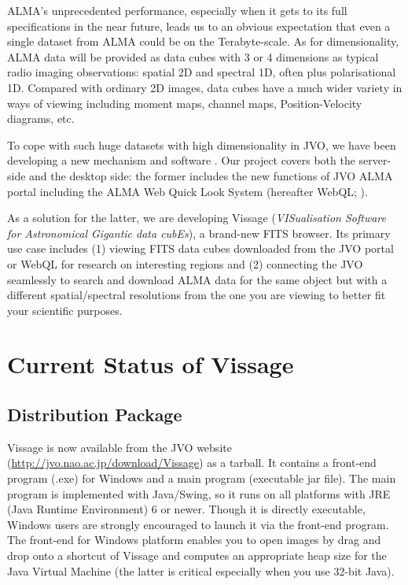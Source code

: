 ALMA's unprecedented performance, especially when it gets to its full specifications in the near future, leads us to an obvious expectation that even a single dataset from ALMA could be on the Terabyte-scale. As for dimensionality, ALMA data will be provided as data cubes with 3 or 4 dimensions as typical radio imaging observations: spatial 2D and spectral  1D, often plus polarisational 1D. Compared with ordinary 2D images, data cubes have a much wider variety in ways of viewing including moment maps, channel maps, Position-Velocity diagrams, etc. 

To cope with such huge datasets with high dimensionality in JVO, we have been developing a new mechanism and software \citep{O10_adassxxii, D5_adassxxii}. Our project covers both the server-side and the desktop side: the former includes the new functions of JVO ALMA portal including the ALMA Web Quick Look System (hereafter WebQL; \citet{O10_adassxxii}). 

As a solution for the latter, we are developing Vissage ({\it VISualisation Software for Astronomical Gigantic data cubEs}), a brand-new FITS browser. Its primary use case includes (1) viewing FITS data cubes downloaded from the JVO portal or WebQL for research on interesting regions and (2) connecting the JVO seamlessly to search and download ALMA data for the same object but with a different spatial/spectral resolutions from the one you are viewing to better fit your scientific purposes. 

\section{Current Status of Vissage}
\subsection{Distribution Package}
Vissage is now available from the JVO website (\url{http://jvo.nao.ac.jp/download/Vissage}) as a tarball. It contains a front-end program (.exe) for Windows and a main program (executable jar file). The main program is implemented with Java/Swing, so it runs on all platforms with JRE (Java Runtime Environment) 6 or newer. Though it is directly executable, Windows users are strongly encouraged to launch it via the front-end program. The front-end for Windows platform enables you to open images by drag and drop onto a shortcut of Vissage and computes an appropriate heap size for the Java Virtual Machine (the latter is critical especially when you use 32-bit Java). 

